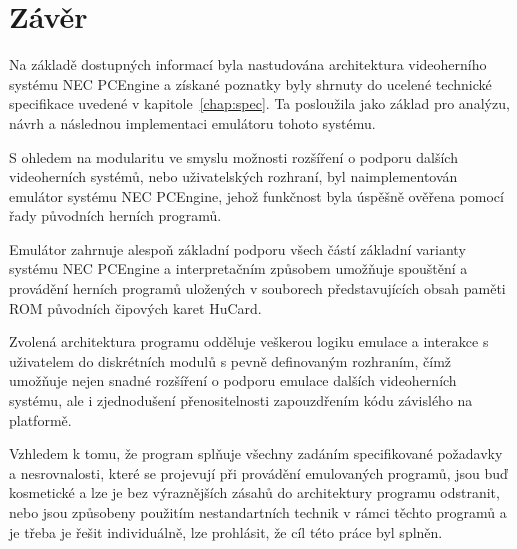 
\chapter{Závěr}

Na základě dostupných informací byla nastudována architektura videoherního
systému NEC PCEngine a získané poznatky byly shrnuty do ucelené technické
specifikace uvedené v kapitole~\ref{chap:spec}. Ta posloužila jako základ pro
analýzu, návrh a následnou implementaci emulátoru tohoto systému.

S ohledem na modularitu ve smyslu možnosti rozšíření o podporu dalších
videoherních systémů, nebo uživatelských rozhraní, byl naimplementován emulátor
systému NEC PCEngine, jehož funkčnost byla úspěšně ověřena pomocí řady
původních herních programů.

Emulátor zahrnuje alespoň základní podporu všech částí základní varianty
systému NEC PCEngine a interpretačním způsobem umožňuje spouštění a provádění
herních programů uložených v souborech představujících obsah paměti ROM
původních čipových karet HuCard.

Zvolená architektura programu odděluje veškerou logiku emulace a interakce s
uživatelem do diskrétních modulů s pevně definovaným rozhraním, čímž umožňuje
nejen snadné rozšíření o podporu emulace dalších videoherních systému, ale i
zjednodušení přenositelnosti zapouzdřením kódu závislého na platformě.

Vzhledem k tomu, že program splňuje všechny zadáním specifikované požadavky a
nesrovnalosti, které se projevují při provádění emulovaných programů, jsou buď
kosmetické a lze je bez výraznějších zásahů do architektury programu odstranit,
nebo jsou způsobeny použitím nestandartních technik v rámci těchto programů a 
je třeba je řešit individuálně, lze prohlásit, že cíl této práce byl splněn.


